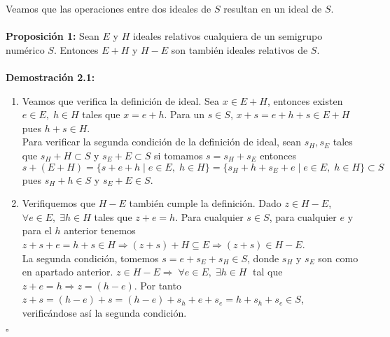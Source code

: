\documentclass[11pt,spanish]{book}
\newcommand{\qed}{\begin{flushright} $\square$ \end{flushright}}
\begin{document}
Veamos que las operaciones entre dos ideales de $S$ resultan en un ideal de $S$.\\
\\ \textbf{Proposición 1:} Sean $E$ y $H$ ideales relativos cualquiera de un semigrupo numérico $S$. Entonces $E+H$ y $H-E$ son también ideales relativos de $S$.\\ \\
\textbf{Demostración 2.1: }
\begin{enumerate}
    \item Veamos que verifica la definición de ideal. Sea $x\in E+H$, entonces existen $e\in E,\; h\in H$ tales que $x=e+h$. Para un $s\in S$, $x+s=e+h+s\in E+H$ pues $h+s\in H$.\\ 
    Para verificar la segunda condición de la definición de ideal, sean $s_{H}, s_{E}$ tales que $s_{H}+H\subset S$ y $s_{E}+E\subset S$ si tomamos $s=s_{H}+s_{E}$ entonces
    $$ s+(E+H)=\{s+e+h\;|\; e\in E,\; h\in H\} =\{s_{H}+h+s_{E}+e\;|\; e\in E,\; h\in H\}\subset S$$
    pues $s_{H}+h\in S$ y $s_{E}+E\in S$.
    \item Verifiquemos que $H-E$ también cumple la definición. Dado $z\in H-E$, $\forall e\in E,\; \exists h\in H$ tales que $z+e=h$. Para cualquier $s\in S$, para cualquier $e$ y para el $h$ anterior tenemos $z+s+e=h+s\in H\Rightarrow (z+s)+H\subseteq E\Rightarrow (z+s)\in H-E$.\\
    La segunda condición, tomemos $s=e+s_{E}+s_{H}\in S$, donde $s_{H}$ y $s_{E}$ son como en apartado anterior. $z\in H-E\Rightarrow\;\forall e\in  E,\;  \exists h\in H\;$ tal que $z+e=h\Rightarrow z = (h-e)$. Por tanto $z+s=(h-e)+s=(h-e)+s_{h}+e+s_{e}=h+s_{h}+s_{e}\in S$, verificándose así la segunda condición.
\end{enumerate}
\qed
\end{document}
